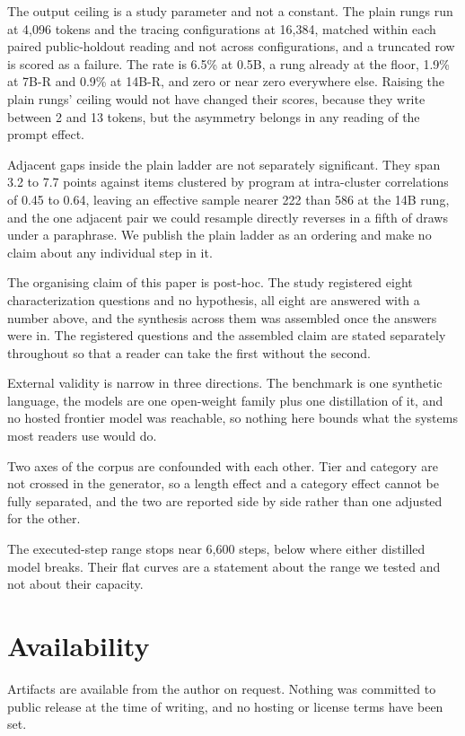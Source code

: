 \documentclass[11pt]{article}
\begin{document}
The output ceiling is a study parameter and not a constant. The plain rungs run at
4{,}096 tokens and the tracing configurations at 16{,}384, matched within each
paired public-holdout reading and not across configurations, and a truncated row is
scored as a failure. The rate is 6.5\% at 0.5B, a rung already at the floor, 1.9\%
at 7B-R and 0.9\% at 14B-R, and zero or near zero everywhere else. Raising the plain
rungs' ceiling would not have changed their scores, because they write between 2 and
13 tokens, but the asymmetry belongs in any reading of the prompt effect.

Adjacent gaps inside the plain ladder are not separately significant. They span
3.2 to 7.7 points against items clustered by program at intra-cluster correlations
of 0.45 to 0.64, leaving an effective sample nearer 222 than 586 at the 14B rung,
and the one adjacent pair we could resample directly reverses in a fifth of draws
under a paraphrase. We publish the plain ladder as an ordering and make no claim
about any individual step in it.

The organising claim of this paper is post-hoc. The study registered eight
characterization questions and no hypothesis, all eight are answered with a number
above, and the synthesis across them was assembled once the answers were in. The
registered questions and the assembled claim are stated separately throughout so
that a reader can take the first without the second.

External validity is narrow in three directions. The benchmark is one synthetic
language, the models are one open-weight family plus one distillation of it, and no
hosted frontier model was reachable, so nothing here bounds what the systems most
readers use would do.

Two axes of the corpus are confounded with each other. Tier and category are not
crossed in the generator, so a length effect and a category effect cannot be fully
separated, and the two are reported side by side rather than one adjusted for the
other.

The executed-step range stops near 6{,}600 steps, below where either distilled model
breaks. Their flat curves are a statement about the range we tested and not about
their capacity.

\section{Availability}

Artifacts are available from the author on request. Nothing was committed to
public release at the time of writing, and no hosting or license terms have been
set.
\end{document}
